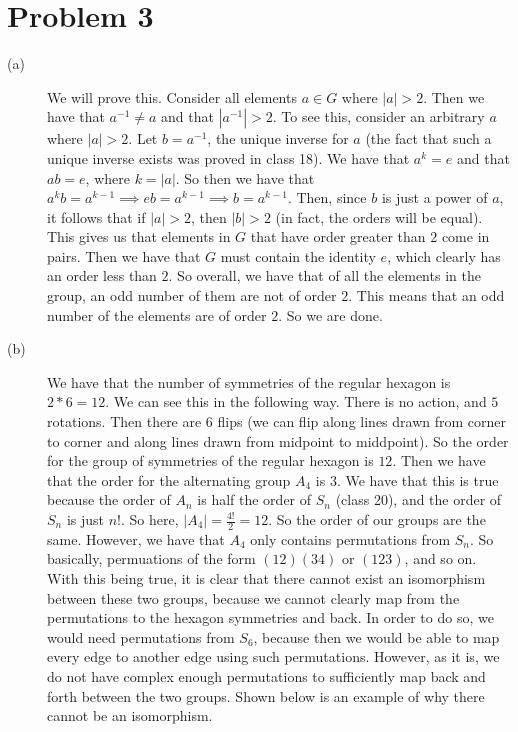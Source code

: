 \documentclass{article}
\begin{document}
\section*{Problem 3}
\begin{description}
    \item[(a)] We will prove this. Consider all elements $a \in G$ where
        $|a| > 2$. Then we have that $a^{-1} \neq a$ and that $|a^{-1}| > 2$.
        To see this, consider an arbitrary $a$ where $|a| > 2$. Let $b = a^{-1}$,
        the unique inverse for $a$ (the fact that such a unique inverse exists
        was proved in class 18).
        We have that $a^k = e$ and that $ab = e$, where $k = |a|$.
        So then we have that
        $a^kb = a^{k-1} \implies eb = a^{k-1} \implies b = a^{k-1}$. Then,
        since $b$ is just a power of $a$, it follows that if $|a| > 2$, then
        $|b| > 2$ (in fact, the orders will be equal). This gives us that
        elements in $G$ that have order greater than $2$ come in pairs. Then
        we have that $G$ must contain the identity $e$, which clearly has
        an order less than $2$. So overall, we have that of all the elements in
        the group, an odd number of them are not of order $2$. This means
        that an odd number of the elements are of order $2$. So we are done.
    \item[(b)] We have that the number of symmetries of the regular hexagon
        is $2*6 = 12$. We can see this in the following way. There is no action,
        and $5$ rotations. Then there are $6$ flips (we can flip along lines
        drawn from corner to corner and along lines drawn from midpoint to
        middpoint). So the order for the group of symmetries of the regular
        hexagon is $12$. Then we have that the order for the alternating
        group $A_4$ is $3$. We have that this is true because the order
        of $A_n$ is half the order of $S_n$ (class 20), and the order of $S_n$
        is just $n!$. So here, $|A_4| = \frac{4!}{2} = 12$. So the order of
        our groups are the same. However, we have that $A_4$ only contains
        permutations from $S_n$. So basically, permuations of the form $(12)(34)$
        or $(123)$, and so on. With this being true, it is clear that there
        cannot exist an isomorphism between these two groups, because we
        cannot clearly map from the permutations to the hexagon symmetries and
        back. In order to do so, we would need permutations from $S_6$, because
        then we would be able to map every edge to another edge using
        such permutations. However, as it is, we do not have complex enough
        permutations to sufficiently map back and forth between the two groups.
        Shown below is an example of why there cannot be an isomorphism.
\newpage
\end{description}
\end{document}
